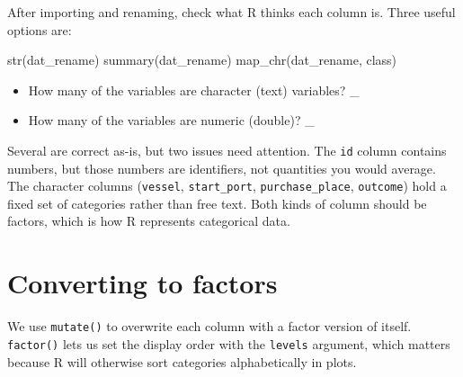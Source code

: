 \documentclass[
  english,
  letterpaper,
]{book}
\newenvironment{Shaded}{\begin{snugshade}}{\end{snugshade}}
\newcommand{\FunctionTok}[1]{\textcolor[rgb]{0.28,0.35,0.67}{#1}}
\newcommand{\NormalTok}[1]{\textcolor[rgb]{0.00,0.23,0.31}{#1}}
\providecommand{\tightlist}{%
  \setlength{\itemsep}{0pt}\setlength{\parskip}{0pt}}
\begin{document}
After importing and renaming, check what R thinks each column is. Three
useful options are:

\begin{Shaded}
\begin{Highlighting}[]
\FunctionTok{str}\NormalTok{(dat\_rename)}
\FunctionTok{summary}\NormalTok{(dat\_rename)}
\FunctionTok{map\_chr}\NormalTok{(dat\_rename, class)}
\end{Highlighting}
\end{Shaded}

\begin{itemize}
\tightlist
\item
  How many of the variables are character (text) variables? \_
\item
  How many of the variables are numeric (double)? \_
\end{itemize}

Several are correct as-is, but two issues need attention. The
\texttt{id} column contains numbers, but those numbers are identifiers,
not quantities you would average. The character columns
(\texttt{vessel}, \texttt{start\_port}, \texttt{purchase\_place},
\texttt{outcome}) hold a fixed set of categories rather than free text.
Both kinds of column should be factors, which is how R represents
categorical data.

\section{Converting to factors}\label{converting-to-factors}

We use \texttt{mutate()} to overwrite each column with a factor version
of itself. \texttt{factor()} lets us set the display order with the
\texttt{levels} argument, which matters because R will otherwise sort
categories alphabetically in plots.
\end{document}

